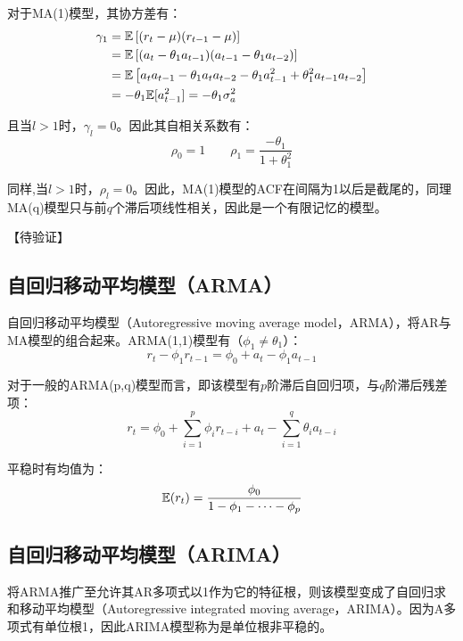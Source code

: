 \documentclass[11pt]{article}
\begin{document}
对于MA(1)模型，其协方差有：
\begin{align*}
    \gamma_1 &= \mathbb{E}\left[(r_t - \mu)(r_{t-1} - \mu)\right] \\
    &= \mathbb{E}\left[(a_t - \theta_1 a_{t-1})(a_{t-1} - \theta_1 a_{t-2})\right] \\
    &= \mathbb{E}\left[ a_{t} a_{t-1} - \theta_1 a_{t} a_{t-2} - \theta_1 a_{t-1}^{2} + \theta_1^2 a_{t-1} a_{t-2} \right] \\
    &= -\theta_1 \mathbb{E}[a_{t-1}^2] = -\theta_1 \sigma_{a}^{2}
\end{align*}

且当$l>1$时，$\gamma_l=0$。因此其自相关系数有：
\begin{equation*}
    \rho_0 = 1 \qquad \rho_1=\frac{-\theta_1}{1 + \theta_1^2}
\end{equation*}

同样,当$l>1$时，$\rho_l=0$。因此，MA(1)模型的ACF在间隔为1以后是截尾的，同理MA(q)模型只与前$q$个滞后项线性相关，因此是一个有限记忆的模型。

【待验证】

\subsection{自回归移动平均模型（ARMA）}

自回归移动平均模型（Autoregressive moving average model，ARMA），将AR与MA模型的组合起来。ARMA(1,1)模型有（$\phi_1 \neq \theta_1$）：
\begin{equation*}
    r_t - \phi_1 r_{t-1} = \phi_0 + a_t - \phi_1 a_{t-1}
\end{equation*}

对于一般的ARMA(p,q)模型而言，即该模型有$p$阶滞后自回归项，与$q$阶滞后残差项：
\begin{equation*}
    r_t = \phi_0 + \sum_{i=1}^{p} \phi_i r_{t-i} + a_t - \sum_{i=1}^{q} \theta_i a_{t-i}
\end{equation*}

平稳时有均值为：
\begin{equation*}
    \mathbb{E}(r_t) = \frac{\phi_0}{1-\phi_1-\dots-\phi_p}
\end{equation*}

\subsection{自回归移动平均模型（ARIMA）}

将ARMA推广至允许其AR多项式以1作为它的特征根，则该模型变成了自回归求和移动平均模型（Autoregressive integrated moving average，ARIMA）。因为A多项式有单位根1，因此ARIMA模型称为是单位根非平稳的。
\end{document}
